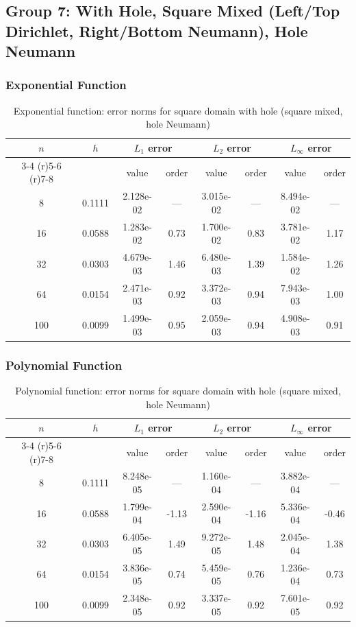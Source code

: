 \documentclass[12pt,a4paper]{article}
\begin{document}
\subsection{Group 7: With Hole, Square Mixed (Left/Top Dirichlet, Right/Bottom Neumann), Hole Neumann}

\subsubsection{Exponential Function}
\begin{table}[H]
\centering
\caption{Exponential function: error norms for square domain with hole (square mixed, hole Neumann)}
\begin{tabular}{cccccccc}
\toprule
$n$ & $h$ & \multicolumn{2}{c}{$L_1$ error} & \multicolumn{2}{c}{$L_2$ error} & \multicolumn{2}{c}{$L_\infty$ error} \\
\cmidrule(r){3-4} \cmidrule(r){5-6} \cmidrule(r){7-8}
& & value & order & value & order & value & order \\
\midrule
8  & 0.1111 & 2.128e-02 & --- & 3.015e-02 & --- & 8.494e-02 & --- \\
16 & 0.0588 & 1.283e-02 & 0.73 & 1.700e-02 & 0.83 & 3.781e-02 & 1.17 \\
32 & 0.0303 & 4.679e-03 & 1.46 & 6.480e-03 & 1.39 & 1.584e-02 & 1.26 \\
64 & 0.0154 & 2.471e-03 & 0.92 & 3.372e-03 & 0.94 & 7.943e-03 & 1.00 \\
100 & 0.0099 & 1.499e-03 & 0.95 & 2.059e-03 & 0.94 & 4.908e-03 & 0.91 \\
\bottomrule
\end{tabular}
\end{table}

\subsubsection{Polynomial Function}
\begin{table}[H]
\centering
\caption{Polynomial function: error norms for square domain with hole (square mixed, hole Neumann)}
\begin{tabular}{cccccccc}
\toprule
$n$ & $h$ & \multicolumn{2}{c}{$L_1$ error} & \multicolumn{2}{c}{$L_2$ error} & \multicolumn{2}{c}{$L_\infty$ error} \\
\cmidrule(r){3-4} \cmidrule(r){5-6} \cmidrule(r){7-8}
& & value & order & value & order & value & order \\
\midrule
8  & 0.1111 & 8.248e-05 & --- & 1.160e-04 & --- & 3.882e-04 & --- \\
16 & 0.0588 & 1.799e-04 & -1.13 & 2.590e-04 & -1.16 & 5.336e-04 & -0.46 \\
32 & 0.0303 & 6.405e-05 & 1.49 & 9.272e-05 & 1.48 & 2.045e-04 & 1.38 \\
64 & 0.0154 & 3.836e-05 & 0.74 & 5.459e-05 & 0.76 & 1.236e-04 & 0.73 \\
100 & 0.0099 & 2.348e-05 & 0.92 & 3.337e-05 & 0.92 & 7.601e-05 & 0.92 \\
\bottomrule
\end{tabular}
\end{table}
\end{document}

